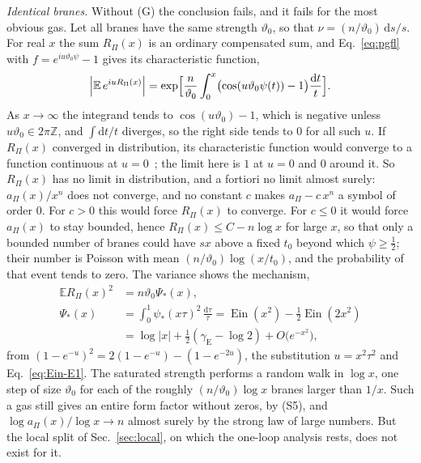 \documentclass[aps,prd,10pt,twocolumn,superscriptaddress,nofootinbib,floatfix,longbibliography]{revtex4-2}
\newcommand{\bE}{\mathbb{E}}
\newcommand{\dd}{\mathrm{d}}
\newcommand{\Ein}{\operatorname{Ein}}
\newcommand{\gE}{\gamma_{\mathrm E}}
\begin{document}
\textit{Identical branes.} Without (G) the conclusion fails, and it fails for the most obvious gas. Let all branes have the same strength $\vartheta_0$, so that $\nu=(n/\vartheta_0)\,\dd s/s$. For real $x$ the sum $R_\Pi(x)$ is an ordinary compensated sum, and Eq.~\eqref{eq:pgfl} with $f=e^{iu\vartheta_0\psi}-1$ gives its characteristic function,
\[
\Bigl|\bE\,e^{iuR_\Pi(x)}\Bigr|=\exp\Bigl[\frac n{\vartheta_0}\int_0^x\bigl(\cos(u\vartheta_0\psi(t))-1\bigr)\frac{\dd t}t\Bigr].
\]
As $x\to\infty$ the integrand tends to $\cos(u\vartheta_0)-1$, which is negative unless $u\vartheta_0\in2\pi\mathbb Z$, and $\int\dd t/t$ diverges, so the right side tends to $0$ for all such $u$. If $R_\Pi(x)$ converged in distribution, its characteristic function would converge to a function continuous at $u=0$~\cite{Feller1971}; the limit here is $1$ at $u=0$ and $0$ around it. So $R_\Pi(x)$ has no limit in distribution, and a fortiori no limit almost surely: $a_\Pi(x)/x^n$ does not converge, and no constant $c$ makes $a_\Pi-c\,x^n$ a symbol of order $0$. For $c>0$ this would force $R_\Pi(x)$ to converge. For $c\le0$ it would force $a_\Pi(x)$ to stay bounded, hence $R_\Pi(x)\le C-n\log x$ for large $x$, so that only a bounded number of branes could have $sx$ above a fixed $t_0$ beyond which $\psi\ge\frac12$; their number is Poisson with mean $(n/\vartheta_0)\log(x/t_0)$, and the probability of that event tends to zero. The variance shows the mechanism,
\begin{equation}
\label{eq:Psistar}
\begin{aligned}
\bE R_\Pi(x)^2&=n\vartheta_0\Psi_*(x),\\
\Psi_*(x)&=\int_0^1\psi_*(x\tau)^2\,\frac{\dd\tau}\tau=\Ein(x^2)-\tfrac12\Ein(2x^2)\\
&=\log|x|+\tfrac12(\gE-\log2)+O\bigl(e^{-x^2}\bigr),
\end{aligned}
\end{equation}
from $(1-e^{-u})^2=2(1-e^{-u})-(1-e^{-2u})$, the substitution $u=x^2\tau^2$ and Eq.~\eqref{eq:Ein-E1}. The saturated strength performs a random walk in $\log x$, one step of size $\vartheta_0$ for each of the roughly $(n/\vartheta_0)\log x$ branes larger than $1/x$. Such a gas still gives an entire form factor without zeros, by (S5), and $\log a_\Pi(x)/\log x\to n$ almost surely by the strong law of large numbers. But the local split of Sec.~\ref{sec:local}, on which the one-loop analysis rests, does not exist for it.
\end{document}
